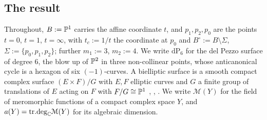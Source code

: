 \subsection{The result}

Throughout, $B := \mathbb{P}^1$ carries the affine coordinate $t$, and $p_1, p_2, p_0$ are the points $t=0$, $t=1$, $t=\infty$, with $t_c := 1/t$ the coordinate at $p_0$ and $B^\circ := B \setminus \Sigma$, $\Sigma := \{p_0,p_1,p_2\}$; further $m_1 := 3$, $m_2 := 4$. We write $\mathrm{dP}_6$ for the del Pezzo surface of degree $6$, the blow up of $\mathbb{P}^2$ in three non-collinear points, whose anticanonical cycle is a hexagon of six $(-1)$-curves. A bielliptic surface is a smooth compact complex surface $(E\times F)/G$ with $E,F$ elliptic curves and $G$ a finite group of translations of $E$ acting on $F$ with $F/G \cong \mathbb{P}^1$ \cite[V.5]{BHPV}, \cite{BdF}, \cite{Ser}. We write $\mathcal M(Y)$ for the field of meromorphic functions of a compact complex space $Y$, and $a(Y) = \mathrm{tr.deg}_{\mathbb{C}}\mathcal M(Y)$ for its algebraic dimension.

